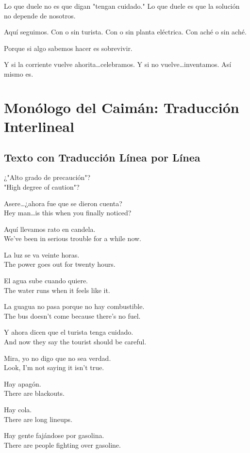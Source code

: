 \documentclass[12pt]{article}
\begin{document}
Lo que duele no es que digan "tengan cuidado." Lo que duele es que la solución no depende de nosotros.

Aquí seguimos. Con o sin turista. Con o sin planta eléctrica. Con aché o sin aché.

Porque si algo sabemos hacer es sobrevivir.

Y si la corriente vuelve ahorita\ldots celebramos. Y si no vuelve\ldots inventamos. Así mismo es.

\section{Monólogo del Caimán: Traducción Interlineal}

\subsection*{Texto con Traducción Línea por Línea}

¿"Alto grado de precaución"?\\
"High degree of caution"?

Asere\ldots ¿ahora fue que se dieron cuenta?\\
Hey man\ldots is this when you finally noticed?

Aquí llevamos rato en candela.\\
We've been in serious trouble for a while now.

La luz se va veinte horas.\\
The power goes out for twenty hours.

El agua sube cuando quiere.\\
The water runs when it feels like it.

La guagua no pasa porque no hay combustible.\\
The bus doesn't come because there's no fuel.

Y ahora dicen que el turista tenga cuidado.\\
And now they say the tourist should be careful.

Mira, yo no digo que no sea verdad.\\
Look, I'm not saying it isn't true.

Hay apagón.\\
There are blackouts.

Hay cola.\\
There are long lineups.

Hay gente fajándose por gasolina.\\
There are people fighting over gasoline.
\end{document}
